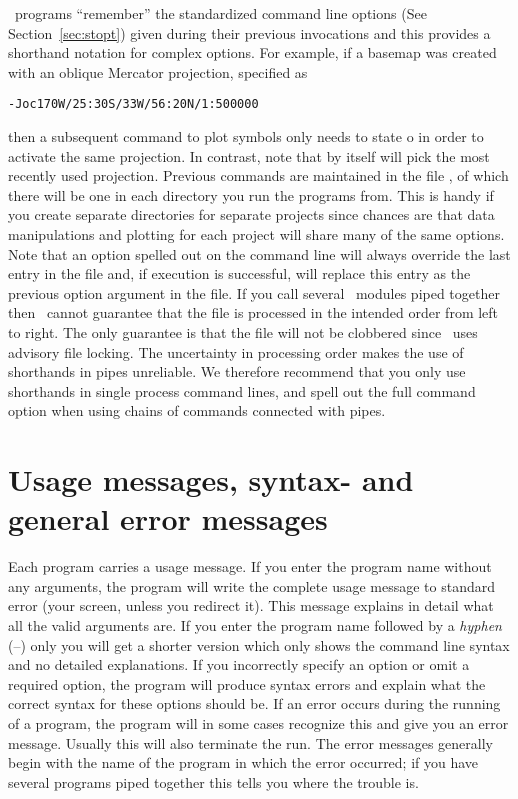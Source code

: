 \GMT\ programs ``remember'' the standardized command line options
(See Section~\ref{sec:stopt}) given during their previous invocations
and this provides a shorthand notation for complex options.
For example, if a basemap was created with an oblique Mercator
projection, specified as

\vspace{\baselineskip}

\texttt{-Joc170W/25:30S/33W/56:20N/1:500000}

\vspace{\baselineskip}
\noindent
then a subsequent  command to plot symbols only needs
to state o in order to activate the same projection.  In
contrast, note that  by itself will pick the most recently used projection.
Previous commands are maintained in the file ,
of which there will be one in each directory you run the programs
from.  This is handy if you create separate directories for
separate projects since chances are that data manipulations
and plotting for each project will share many of the same options.
Note that an option spelled out on the command line will always
override the last entry in the  file and,
if execution is successful, will replace this entry as the
previous option argument in the  file.
If you call several \GMT\ modules piped together then \GMT\ cannot
guarantee that the  file is processed
in the intended order from left to right.  The only guarantee
is that the file will not be clobbered since \GMT\ uses advisory
file locking.  The uncertainty in processing order makes the use
of shorthands in pipes unreliable.  We therefore recommend that you
only use shorthands in single process command lines, and spell out
the full command option when using chains of commands connected with
pipes.

\section{Usage messages, syntax- and general error messages}

Each program carries a usage message.  If you enter the program
name without any arguments, the program will write the complete
usage message to standard error (your screen, unless you
redirect it).  This message explains in detail what all the
valid arguments are.  If you enter the program name followed
by a \emph{hyphen} (--) only you will get a shorter version
which only shows the command line syntax and no detailed
explanations.  If you incorrectly specify an option or omit
a required option, the program will produce syntax errors and
explain what the correct syntax for these options should be.
If an error occurs during the running of a program, the
program will in some cases recognize this and give you an
error message.  Usually this will also terminate the run.
The error messages generally begin with the name of the
program in which the error occurred; if you have several
programs piped together this tells you where the trouble is.

